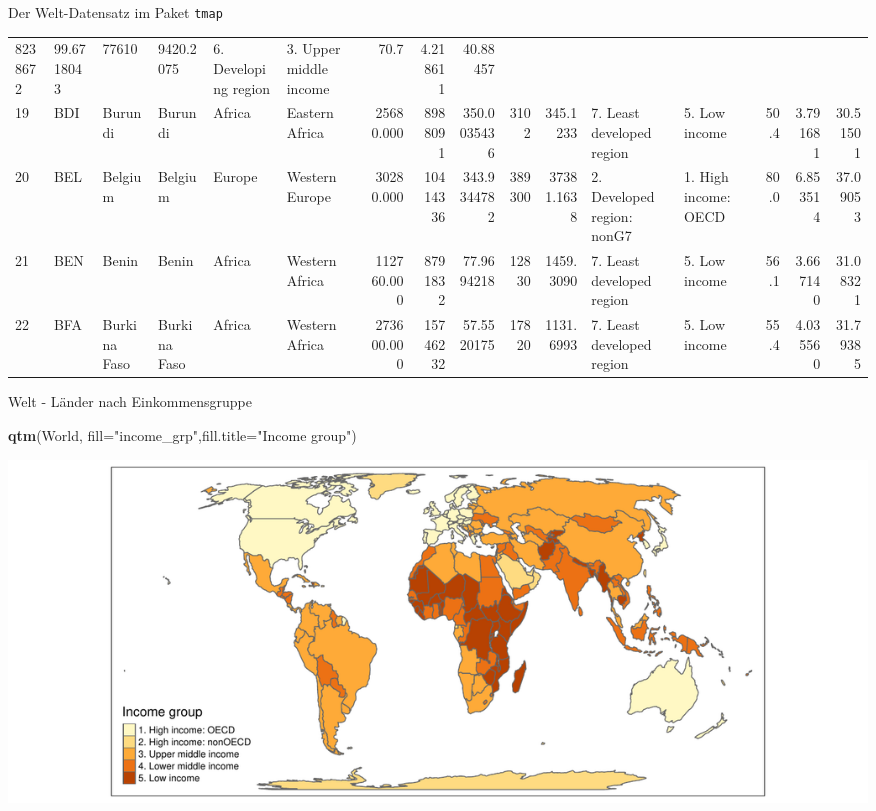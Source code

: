 \documentclass[ignorenonframetext,]{beamer}
\newenvironment{Shaded}{\begin{snugshade}}{\end{snugshade}}
\newcommand{\KeywordTok}[1]{\textcolor[rgb]{0.13,0.29,0.53}{\textbf{#1}}}
\newcommand{\DataTypeTok}[1]{\textcolor[rgb]{0.13,0.29,0.53}{#1}}
\newcommand{\StringTok}[1]{\textcolor[rgb]{0.31,0.60,0.02}{#1}}
\newcommand{\NormalTok}[1]{#1}
\begin{document}
\begin{frame}{Der Welt-Datensatz im Paket \texttt{tmap}}
\begin{longtable}[]{@{}llllllrrrrrllrrr@{}}
8238672 & 99.6718043 & 77610 & 9420.2075 & 6. Developing region & 3.
Upper middle income & 70.7 & 4.218611 & 40.88457\tabularnewline
19 & BDI & Burundi & Burundi & Africa & Eastern Africa & 25680.000 &
8988091 & 350.0035436 & 3102 & 345.1233 & 7. Least developed region & 5.
Low income & 50.4 & 3.791681 & 30.51501\tabularnewline
20 & BEL & Belgium & Belgium & Europe & Western Europe & 30280.000 &
10414336 & 343.9344782 & 389300 & 37381.1638 & 2. Developed region:
nonG7 & 1. High income: OECD & 80.0 & 6.853514 & 37.09053\tabularnewline
21 & BEN & Benin & Benin & Africa & Western Africa & 112760.000 &
8791832 & 77.9694218 & 12830 & 1459.3090 & 7. Least developed region &
5. Low income & 56.1 & 3.667140 & 31.08321\tabularnewline
22 & BFA & Burkina Faso & Burkina Faso & Africa & Western Africa &
273600.000 & 15746232 & 57.5520175 & 17820 & 1131.6993 & 7. Least
developed region & 5. Low income & 55.4 & 4.035560 &
31.79385\tabularnewline
\bottomrule
\end{longtable}

\end{frame}

\begin{frame}[fragile]{Welt - Länder nach Einkommensgruppe}

\begin{Shaded}
\begin{Highlighting}[]
\KeywordTok{qtm}\NormalTok{(World, }\DataTypeTok{fill=}\StringTok{"income_grp"}\NormalTok{,}\DataTypeTok{fill.title=}\StringTok{"Income group"}\NormalTok{) }
\end{Highlighting}
\end{Shaded}

\includegraphics{tmap_files/figure-beamer/unnamed-chunk-23-1.pdf}

\end{frame}
\end{document}
